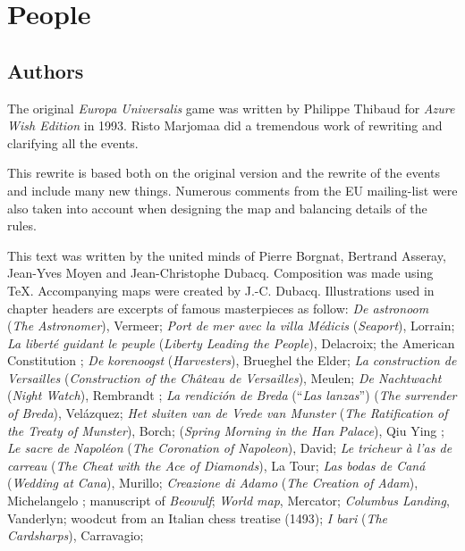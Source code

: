 

\chapter*{People}

\section*{Authors}

The original \emph{Europa Universalis} game was written by Philippe Thibaud
for \emph{Azure Wish Edition} in 1993. Risto Marjomaa did a tremendous work of
rewriting and clarifying all the events.

This rewrite is based both on the original version and the rewrite of the
events and include many new things. Numerous comments from the EU mailing-list
were also taken into account when designing the map and balancing details of
the rules.

This text was written by the united minds of Pierre Borgnat, Bertrand Asseray,
Jean-Yves Moyen and Jean-Christophe Dubacq. Composition was made using
\TeX. Accompanying maps were created by J.-C. Dubacq. Illustrations used in
chapter headers are excerpts of famous masterpieces as follow:
\emph{De astronoom} (\emph{The Astronomer}), %
Vermeer;
\emph{Port de mer avec la villa Médicis} (\emph{Seaport}), %
Lorrain;
\emph{La liberté guidant le peuple} (\emph{Liberty Leading the People}),
Delacroix;
the American Constitution%
;
\emph{De korenoogst} (\emph{Harvesters}), %
Brueghel the Elder;
\emph{La construction de Versailles} (\emph{Construction of the Château de
  Versailles}), %
Meulen;
\emph{De Nachtwacht} (\emph{Night Watch}), Rembrandt%
;
\emph{La rendición de Breda} (``\emph{Las lanzas}'') (\emph{The surrender of
  Breda}), %
Velázquez;
\emph{Het sluiten van de Vrede van Munster} (\emph{The Ratification of the Treaty of Munster}), %
Borch;
(\emph{Spring Morning in the Han Palace}), Qiu Ying %
;
\emph{Le sacre de Napoléon} (\emph{The Coronation of Napoleon}),
David;
\emph{Le tricheur à l'as de carreau} (\emph{The Cheat with the Ace of
  Diamonds}), %
La Tour;
\emph{Las bodas de Caná} (\emph{Wedding at Cana}), %
Murillo;
\emph{Creazione di Adamo} (\emph{The Creation of Adam}), Michelangelo%
;
manuscript of \emph{Beowulf};
\emph{World map}, %
Mercator;
\emph{Columbus Landing}, %
Vanderlyn; 
woodcut from an Italian chess treatise (1493);
\emph{I bari} (\emph{The Cardsharps}), %
Carravagio;


